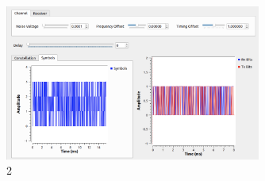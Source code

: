 \documentclass[10pt,a4paper,oneside]{article}
\begin{document}
\begin{figure}[H]
        \centering
        \includegraphics[width=0.75\textwidth]{pics/24.png}
        \caption{2}
        \label{fig:first}
\end{figure}
\end{document}
